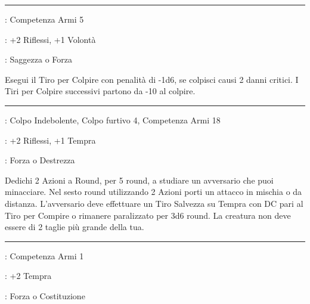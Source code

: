 \begin{multicols}{2}
\smallskip\noindent\rule{\linewidth}{2pt} \hypertarget{Colpo Mortale}{}\medskip{}
\noindent
\begin{description}[noitemsep, topsep=0pt, parsep=0pt, partopsep=0pt, leftmargin=0cm, labelwidth=2.5cm]
    \item[\textbf{Requisito}]: Competenza Armi 5
    \item[\textbf{Tiri Salvezza}]: +2 Riflessi, +1 Volontà
    \item[\textbf{Caratteristica}]: Saggezza o Forza
\end{description}

Esegui il Tiro per Colpire con penalità di -1d6, se colpisci causi 2 danni critici. I Tiri per Colpire successivi partono da -10 al colpire.

\smallskip\noindent\rule{\linewidth}{2pt} \hypertarget{Colpo Paralizzante}{}\medskip{}
\noindent
\begin{description}[noitemsep, topsep=0pt, parsep=0pt, partopsep=0pt, leftmargin=0cm, labelwidth=2.5cm]
    \item[\textbf{Requisito}]: Colpo Indebolente, Colpo furtivo 4, Competenza Armi 18
    \item[\textbf{Tiri Salvezza}]: +2 Riflessi, +1 Tempra
    \item[\textbf{Caratteristica}]: Forza o Destrezza
\end{description}

Dedichi 2 Azioni a Round, per 5 round, a studiare un avversario che puoi minacciare. Nel sesto round utilizzando 2 Azioni porti un attacco in mischia o da distanza. L'avversario deve effettuare un Tiro Salvezza su Tempra con DC pari al Tiro per Compire o rimanere paralizzato per 3d6 round. La creatura non deve essere di 2 taglie più grande della tua.

\smallskip\noindent\rule{\linewidth}{2pt} \hypertarget{Colpi Poderosi}{}\medskip{}
\noindent
\begin{description}[noitemsep, topsep=0pt, parsep=0pt, partopsep=0pt, leftmargin=0cm, labelwidth=2.5cm]
    \item[\textbf{Requisito}]: Competenza Armi 1
    \item[\textbf{Tiri Salvezza}]: +2 Tempra
    \item[\textbf{Caratteristica}]: Forza o Costituzione
\end{description}


\end{multicols}

